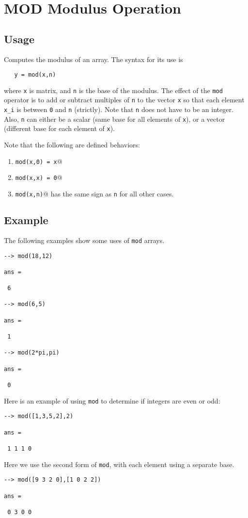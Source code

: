 \section{MOD Modulus Operation}

\subsection{Usage}

Computes the modulus of an array.  The syntax for its use is
\begin{verbatim}
   y = mod(x,n)
\end{verbatim}
where \verb|x| is matrix, and \verb|n| is the base of the modulus.  The
effect of the \verb|mod| operator is to add or subtract multiples of \verb|n|
to the vector \verb|x| so that each element \verb|x_i| is between \verb|0| and \verb|n|
(strictly).  Note that \verb|n| does not have to be an integer.  Also,
\verb|n| can either be a scalar (same base for all elements of \verb|x|), or a
vector (different base for each element of \verb|x|).

Note that the following are defined behaviors:
\begin{enumerate}
\item  \verb|mod(x,0) = x|@

\item  \verb|mod(x,x) = 0|@

\item  \verb|mod(x,n)|@ has the same sign as \verb|n| for all other cases.

\end{enumerate}
\subsection{Example}

The following examples show some uses of \verb|mod|
arrays.
\begin{verbatim}
--> mod(18,12)

ans = 

 6 

--> mod(6,5)

ans = 

 1 

--> mod(2*pi,pi)

ans = 

 0 
\end{verbatim}
Here is an example of using \verb|mod| to determine if integers are even
 or odd:
\begin{verbatim}
--> mod([1,3,5,2],2)

ans = 

 1 1 1 0 
\end{verbatim}
Here we use the second form of \verb|mod|, with each element using a 
separate base.
\begin{verbatim}
--> mod([9 3 2 0],[1 0 2 2])

ans = 

 0 3 0 0 
\end{verbatim}
